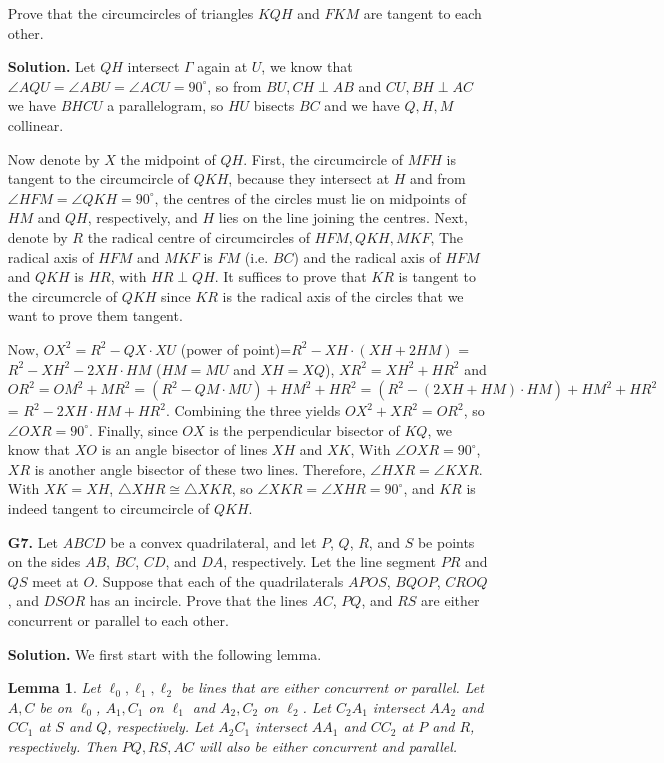 \documentclass[11pt,a4paper]{article}
\newtheorem{lemma}{Lemma}
\begin{document}
\begin{enumerate}
Prove that the circumcircles of triangles $KQH$ and $FKM$ are tangent to each other.


\textbf{Solution.} Let $QH$ intersect $\Gamma$ again at $U$, we know that $\angle AQU=\angle ABU=\angle ACU=90^{\circ}$, so from $BU,CH \perp AB$ and $CU, BH\perp AC$ we have $BHCU$ a parallelogram, so $HU$ bisects $BC$ and we have $Q,H,M$ collinear.

Now denote by $X$ the midpoint of $QH$. First, the circumcircle of $MFH$ is tangent to the circumcircle of $QKH$, because they intersect at $H$ and from $\angle HFM=\angle QKH=90^{\circ}$, the centres of the circles must lie on midpoints of $HM$ and $QH$, respectively, and $H$ lies on the line joining the centres. Next, denote by $R$ the radical centre of circumcircles of $HFM, QKH, MKF$, The radical axis of $HFM$ and $MKF$ is $FM$ (i.e. $BC$) and the radical axis of $HFM$ and $QKH$ is $HR$, with $HR\perp QH$. It suffices to prove that $KR$ is tangent to the circumcrcle of $QKH$ since $KR$ is the radical axis of the circles that we want to prove them tangent.

Now, $OX^{2}=R^2-QX\cdot XU$ (power of point)=$R^2-XH\cdot (XH+2HM)$ = $R^2-XH^2-2XH\cdot HM$ ($HM=MU$ and $XH=XQ$), $XR^2=XH^2+HR^2$ and $OR^2=OM^2+MR^2=(R^2-QM\cdot MU)+HM^2+HR^2=(R^2-(2XH+HM)\cdot HM)+HM^2+HR^2$= $R^2-2XH\cdot HM+HR^2$. Combining the three yields $OX^2+XR^2=OR^2$, so $\angle OXR=90^{\circ}$. Finally, since $OX$ is the perpendicular bisector of $KQ$, we know that $XO$ is an angle bisector of lines $XH$ and $XK$, With $\angle OXR=90^{\circ}$, $XR$ is another angle bisector of these two lines. Therefore, $\angle HXR=\angle KXR$. With $XK=XH$, $\triangle XHR\cong\triangle XKR$, so $\angle XKR=\angle XHR=90^{\circ}$, and $KR$ is indeed tangent to circumcircle of $QKH$.

\item[\textbf{G7.}] Let $ABCD$ be a convex quadrilateral, and let $P$, $Q$, $R$, and $S$ be points on the sides $AB$, $BC$, $CD$, and $DA$, respectively. Let the line segment $PR$ and $QS$ meet at $O$. Suppose that each of the quadrilaterals $APOS$, $BQOP$, $CROQ$, and $DSOR$ has an incircle. Prove that the lines $AC$, $PQ$, and $RS$ are either concurrent or parallel to each other.

\textbf{Solution.} 
We first start with the following lemma.

\begin{lemma}
	Let $\ell_0, \ell_1, \ell_2$ be lines that are either concurrent or parallel. 
	Let $A, C$ be on $\ell_0$, $A_1, C_1$ on $\ell_1$ and $A_2, C_2$ on $\ell_2$. 
	Let $C_2A_1$ intersect $AA_2$ and $CC_1$ at $S$ and $Q$, respectively. 
	Let $A_2C_1$ intersect $AA_1$ and $CC_2$ at $P$ and $R$, respectively. 
	Then $PQ, RS, AC$ will also be either concurrent and parallel. 
\end{lemma}
 

\end{enumerate}
\end{document}

